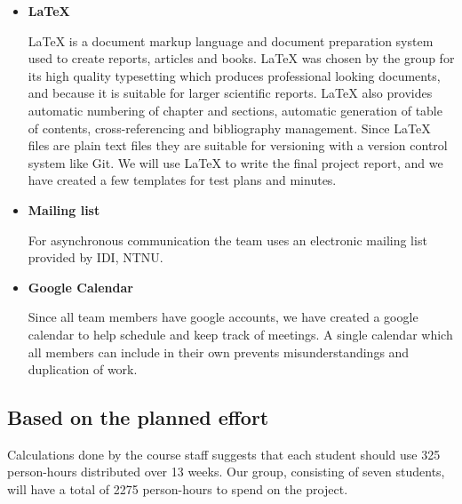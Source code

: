 \begin{itemize}
\item \textbf{LaTeX}

LaTeX is a document markup language and document preparation system used to create reports, articles and books. LaTeX was chosen by the group for its high quality typesetting which produces professional looking documents, and because it is suitable for larger scientific reports. LaTeX also provides automatic numbering of chapter and sections, automatic generation of table of contents, cross-referencing and bibliography management. Since LaTeX files are plain text files they are suitable for versioning with a version control system like Git. We will use LaTeX to write the final project report, and we have created a few templates for test plans and minutes.

\item \textbf{Mailing list}

For asynchronous communication the team uses an electronic mailing list provided by IDI, NTNU.

\item \textbf{Google Calendar}

Since all team members have google accounts, we have created a google calendar to help schedule and keep track of meetings. A single calendar which all members can include in their own prevents misunderstandings and duplication of work.

\end{itemize}

\subsection{Based on the planned effort}
Calculations done by the course staff suggests that each student should use 325 person-hours distributed over 13 weeks. Our group, consisting of seven students, will have a total of 2275 person-hours to spend on the project. 

